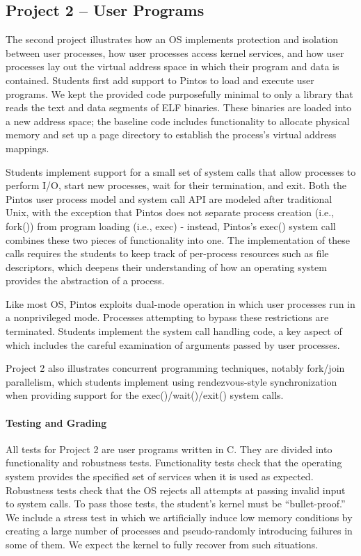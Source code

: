 %
%
%
\subsection{Project 2 -- User Programs}
The second project illustrates how an OS implements protection and isolation between user processes,
how user processes access kernel services, and how user processes lay out the virtual
address space in which their program and data is contained.
Students first add support to Pintos to load and execute user programs.
We kept the provided code purposefully minimal to
only a library that reads the text and data segments of ELF binaries.   These binaries
are loaded into a new address space; the baseline code includes functionality to allocate
physical memory and set up a page directory to establish the process's virtual address
mappings.

Students implement support for a small set of system calls that allow processes to perform
I/O, start new processes, wait for their termination, and exit.  Both the Pintos user 
process model and system call API are modeled after traditional Unix, with the exception 
that Pintos does not separate process creation (i.e., fork()) from program loading
(i.e., exec) - instead, Pintos's exec() system call combines these two pieces of functionality 
into one.  The implementation of these calls requires the students to keep track of
per-process resources such as file descriptors, which deepens their understanding of how
an operating system provides the abstraction of a process.

Like most OS, Pintos exploits dual-mode operation in which user processes run
in a nonprivileged mode.
Processes attempting to bypass these restrictions are terminated.
Students implement the system call handling code, a key aspect of which includes the
careful examination of arguments passed by user processes.

Project 2 also illustrates concurrent programming techniques, notably fork/join
parallelism, which students implement using rendezvous-style synchronization 
when providing support for the exec()/wait()/exit() system calls.  

\paragraph{Testing and Grading}
All tests for Project 2 are user programs written in C.
They are divided into functionality and robustness tests.  Functionality tests check that
the operating system provides the specified set of services when it is used as
expected.  Robustness tests check that the OS rejects all attempts at passing
invalid input to system calls.  To pass those tests, the student's kernel must be 
``bullet-proof.'' We include a stress test in which we artificially induce low memory
conditions by creating a large number of processes and pseudo-randomly introducing
failures in some of them.  We expect the kernel to fully recover from such situations.

